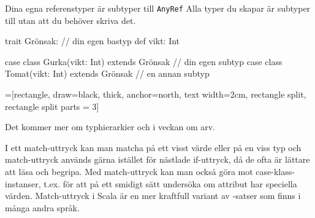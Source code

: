 \begin{Slide}{Dina egna referenstyper är subtyper till \texttt{AnyRef}}\SlideFontSmall
Alla typer du skapar är subtyper till  utan att du behöver skriva det.
\begin{Code}
trait Grönsak:                                 // din egen bastyp
  def vikt: Int

case class Gurka(vikt: Int) extends Grönsak    // din egen subtyp
case class Tomat(vikt: Int) extends Grönsak    // en annan subtyp
\end{Code}
\SlideFontSmall
\vspace{-0.0em}\begin{center}
\newcommand{\TextBox}[1]{\raisebox{0pt}[1em][0.5em]{#1}}
=[rectangle, draw=black,  thick, anchor=north, text width=2cm, rectangle split, rectangle split parts = 3]
\end{center}
Det kommer mer om typhierarkier och  i veckan om arv.
\end{Slide}


\ifkompendium
\noindent  I ett match-uttryck kan man matcha på ett visst värde eller på en viss typ och match-uttryck används gärna istället för nästlade if-uttryck, då de ofta är lättare att läsa och begripa. Med match-uttryck kan man också göra  mot case-klass-instanser, t.ex. för att på ett smidigt sätt undersöka om attribut har speciella värden. Match-uttryck i Scala är en mer kraftfull variant av -satser som finns i många andra språk.  
\fi

